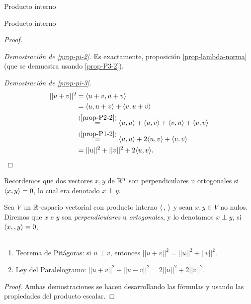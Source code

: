 \begin{chapter}{Producto interno}
\begin{section}{Producto interno}
\begin{proof}
            ${}^{}$
            
            \textit{Demostración de \ref{prop-pi-2}.}  Es exactamente, proposición \ref{prop-lambda-norma} (que se demuestra usando \ref{prop-P3-2}).
            
            \textit{Demostración de \ref{prop-pi-3}.}
            \begin{align*}
                ||u+v||^2 &= \langle u+v,u+v\rangle\\
                &= \langle u,u+v\rangle+ \langle v,u+v\rangle  \\
                &\stackrel{(\ref{prop-P2-2})}{=} \langle u,u\rangle+ \langle u,v\rangle+\langle v,u\rangle+ \langle v,v\rangle  \\
                &\stackrel{(\ref{prop-P1-2})}{=} \langle u,u\rangle+ 2\langle u,v\rangle+ \langle v,v\rangle  \\
                &=||u||^2 + ||v||^2 + 2\langle u,v\rangle.
            \end{align*}
            
            
        \end{proof}
        
 
        
        Recordemos que dos vectores $x,y$  de $\mathbb R^n$ son perpendiculares u ortogonales si $\langle x,y\rangle =0$, lo cual era denotado $x \perp y$. 
        
        \begin{definicion}  Sea $V$  un $\mathbb R$-espacio vectorial con producto interno $\langle \,,\,\rangle$  y  sean $x,y \in V$ no nulos. Diremos que $x$ e $y$  son \textit{perpendiculares} u  \textit{ortogonales}, y lo denotamos  $x \perp y$, si $\langle x,,y\rangle =0$. 
        \end{definicion}

        \begin{proposicion}
            ${}^{}$
            \begin{enumerate}
                \item\label{it.pitagoras} Teorema de Pitágoras: si $u\perp v$, entonces $||u+v||^2 = ||u||^2 + ||v||^2$.
                \item\label{it.paralelogramo} Ley del Paralelogramo: $||u+v||^2+ ||u-v||^2 = 2||u||^2 + 2||v||^2$.
            \end{enumerate}
        \end{proposicion}
        \begin{proof} Ambas demostraciones se hacen desarrollando las fórmulas y usando las propiedades del producto escalar.
            

\end{proof}
\end{section}
\end{chapter}

